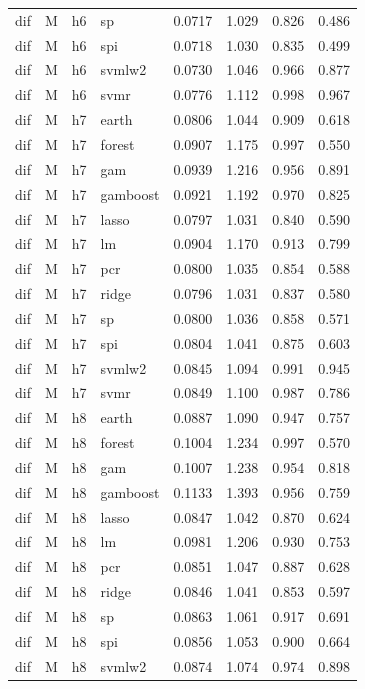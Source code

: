 \begin{ThreePartTable}
\begin{longtable}[t]{llclcccc}
dif & M & h6 & sp & 0.0717 & 1.029 & 0.826 & 0.486\\
dif & M & h6 & spi & 0.0718 & 1.030 & 0.835 & 0.499\\
dif & M & h6 & svmlw2 & 0.0730 & 1.046 & 0.966 & 0.877\\
dif & M & h6 & svmr & 0.0776 & 1.112 & 0.998 & 0.967\\
\addlinespace
dif & M & h7 & earth & 0.0806 & 1.044 & 0.909 & 0.618\\
dif & M & h7 & forest & 0.0907 & 1.175 & 0.997 & 0.550\\
dif & M & h7 & gam & 0.0939 & 1.216 & 0.956 & 0.891\\
dif & M & h7 & gamboost & 0.0921 & 1.192 & 0.970 & 0.825\\
dif & M & h7 & lasso & 0.0797 & 1.031 & 0.840 & 0.590\\
dif & M & h7 & lm & 0.0904 & 1.170 & 0.913 & 0.799\\
dif & M & h7 & pcr & 0.0800 & 1.035 & 0.854 & 0.588\\
dif & M & h7 & ridge & 0.0796 & 1.031 & 0.837 & 0.580\\
dif & M & h7 & sp & 0.0800 & 1.036 & 0.858 & 0.571\\
dif & M & h7 & spi & 0.0804 & 1.041 & 0.875 & 0.603\\
dif & M & h7 & svmlw2 & 0.0845 & 1.094 & 0.991 & 0.945\\
dif & M & h7 & svmr & 0.0849 & 1.100 & 0.987 & 0.786\\
\addlinespace
dif & M & h8 & earth & 0.0887 & 1.090 & 0.947 & 0.757\\
dif & M & h8 & forest & 0.1004 & 1.234 & 0.997 & 0.570\\
dif & M & h8 & gam & 0.1007 & 1.238 & 0.954 & 0.818\\
dif & M & h8 & gamboost & 0.1133 & 1.393 & 0.956 & 0.759\\
dif & M & h8 & lasso & 0.0847 & 1.042 & 0.870 & 0.624\\
dif & M & h8 & lm & 0.0981 & 1.206 & 0.930 & 0.753\\
dif & M & h8 & pcr & 0.0851 & 1.047 & 0.887 & 0.628\\
dif & M & h8 & ridge & 0.0846 & 1.041 & 0.853 & 0.597\\
dif & M & h8 & sp & 0.0863 & 1.061 & 0.917 & 0.691\\
dif & M & h8 & spi & 0.0856 & 1.053 & 0.900 & 0.664\\
dif & M & h8 & svmlw2 & 0.0874 & 1.074 & 0.974 & 0.898\\

\end{longtable}
\end{ThreePartTable}
